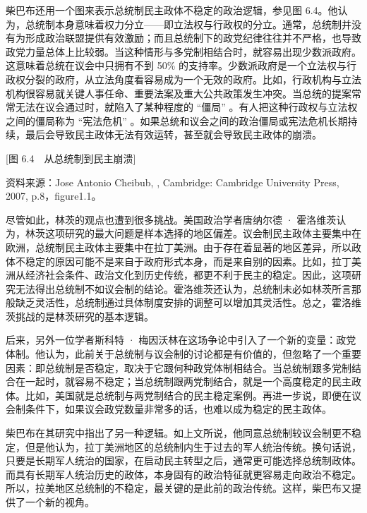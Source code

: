 柴巴布还用一个图来表示总统制民主政体不稳定的政治逻辑，参见图 6.4。他认为，总统制本身意味着权力分立——即立法权与行政权的分立。通常，总统制并没有为形成政治联盟提供有效激励；而且总统制下的政党纪律往往并不严格，也导致政党力量总体上比较弱。当这种情形与多党制相结合时，就容易出现少数派政府。这意味着总统在议会中只拥有不到 50\% 的支持率。少数派政府是一个立法权与行政权分裂的政府，从立法角度看容易成为一个无效的政府。比如，行政机构与立法机构很容易就关键人事任命、重要法案及重大公共政策发生冲突。当总统的提案常常无法在议会通过时，就陷入了某种程度的 “僵局” 。有人把这种行政权与立法权之间的僵局称为 “宪法危机” 。如果总统和议会之间的政治僵局或宪法危机长期持续，最后会导致民主政体无法有效运转，甚至就会导致民主政体的崩溃。

[图 6.4　从总统制到民主崩溃]

资料来源：Jose Antonio Cheibub, , Cambridge: Cambridge University Press, 2007, p.8，figure1.1。

尽管如此，林茨的观点也遭到很多挑战。美国政治学者唐纳尔德 · 霍洛维茨认为，林茨这项研究的最大问题是样本选择的地区偏差。议会制民主政体主要集中在欧洲，总统制民主政体主要集中在拉丁美洲。由于存在着显著的地区差异，所以政体不稳定的原因可能不是来自于政府形式本身，而是来自别的因素。比如，拉丁美洲从经济社会条件、政治文化到历史传统，都更不利于民主的稳定。因此，这项研究无法得出总统制不如议会制的结论。霍洛维茨还认为，总统制未必如林茨所言那般缺乏灵活性，总统制通过具体制度安排的调整可以增加其灵活性。总之，霍洛维茨挑战的是林茨研究的基本逻辑。

后来，另外一位学者斯科特 · 梅因沃林在这场争论中引入了一个新的变量：政党体制。他认为，此前关于总统制与议会制的讨论都是有价值的，但忽略了一个重要因素：即总统制是否稳定，取决于它跟何种政党体制相结合。当总统制跟多党制结合在一起时，就容易不稳定；当总统制跟两党制结合，就是一个高度稳定的民主政体。比如，美国就是总统制与两党制结合的民主稳定案例。再进一步说，即便在议会制条件下，如果议会政党数量非常多的话，也难以成为稳定的民主政体。

柴巴布在其研究中指出了另一种逻辑。如上文所说，他同意总统制较议会制更不稳定，但是他认为，拉丁美洲地区的总统制内生于过去的军人统治传统。换句话说，只要是长期军人统治的国家，在启动民主转型之后，通常更可能选择总统制政体。而具有长期军人统治历史的政体，本身固有的政治特征就更容易走向政治不稳定。所以，拉美地区总统制的不稳定，最关键的是此前的政治传统。这样，柴巴布又提供了一个新的视角。

